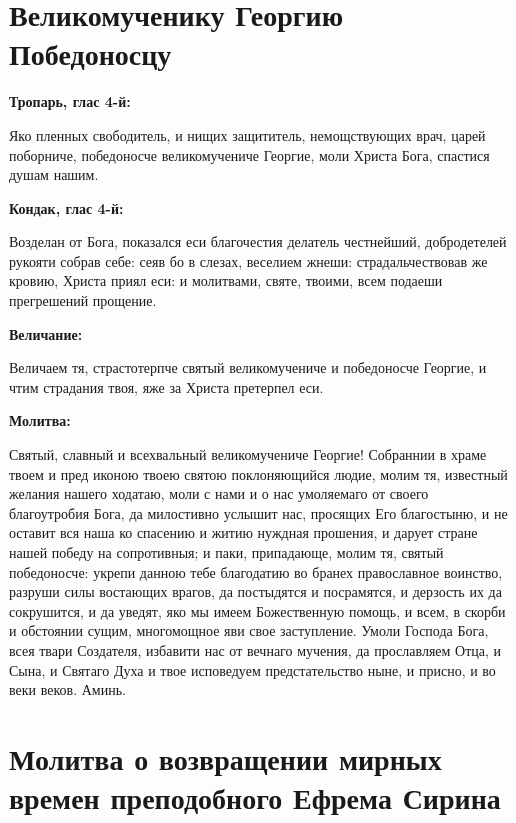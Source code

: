 \section{Великомученику Георгию Победоносцу}
 

\bfseries Тропарь, глас 4-й:\normalfont{}


Яко пленных свободитель, и нищих защититель, немощствующих врач, царей поборниче, победоносче великомучениче Георгие, моли Христа Бога, спастися душам нашим.


\medskip


\bfseries Кондак, глас 4-й:\normalfont{}


Возделан от Бога, показался еси благочестия делатель честнейший, добродетелей рукояти собрав себе: сеяв бо в слезах, веселием жнеши: страдальчествовав же кровию, Христа приял еси: и молитвами, святе, твоими, всем подаеши прегрешений прощение.


\medskip


\bfseries Величание:\normalfont{}


Величаем тя, страстотерпче святый великомучениче и победоносче Георгие, и чтим страдания твоя, яже за Христа претерпел еси.


\medskip


\bfseries Молитва:\normalfont{}


Святый, славный и всехвальный великомучениче Георгие! Собраннии в храме твоем и пред иконою твоею святою поклоняющийся людие, молим тя, известный желания нашего ходатаю, моли с нами и о нас умоляемаго от своего благоутробия Бога, да милостивно услышит нас, просящих Его благостыню, и не оставит вся наша ко спасению и житию нуждная прошения, и дарует стране нашей победу на сопротивныя; и паки, припадающе, молим тя, святый победоносче: укрепи данною тебе благодатию во бранех православное воинство, разруши силы востающих врагов, да постыдятся и посрамятся, и дерзость их да сокрушится, и да уведят, яко мы имеем Божественную помощь, и всем, в скорби и обстоянии сущим, многомощное яви свое заступление. Умоли Господа Бога, всея твари Создателя, избавити нас от вечнаго мучения, да прославляем Отца, и Сына, и Святаго Духа и твое исповедуем предстательство ныне, и присно, и во веки веков. Аминь.


\section{Молитва о возвращении мирных времен преподобного Ефрема Сирина}
 


